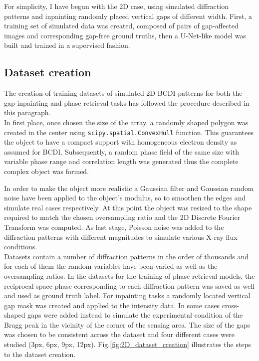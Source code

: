 For simplicity, I have begun with the 2D case, using simulated diffraction patterns and inpainting randomly placed 
vertical gaps of different width. First, a training set of simulated data was created, composed of pairs of gap-affected 
images and corresponding gap-free ground truths, then a U-Net-like model was built and trained in a supervised fashion.

\subsection{Dataset creation}\label{sec:dataset_creation2D}

The creation of training datasets of simulated 2D BCDI patterns for both the gap-inpainting and phase retrieval tasks has followed the procedure
described in this paragraph.\\
In first place, once chosen the size of the array, a randomly shaped polygon was created in the center using 
\texttt{scipy.spatial.ConvexHull} function. This guarantees the object to have a compact support with homogeneous electron 
density as assumed for BCDI. Subsequently, a random phase field of the same size with variable phase range and correlation 
length was generated thus the complete complex object was formed.

In order to make the object more realistic a Gaussian filter and Gaussian random noise have been applied to the 
object's modulus, so to smoothen the edges and simulate real cases respectively. At this point the object was resized 
to the shape required to match the chosen oversampling ratio and the 2D Discrete Fourier Transform was computed. As 
last stage, Poisson noise was added to the diffraction patterns with different magnitudes to simulate 
various X-ray flux conditions. \\
Datasets contain a number of diffraction patterns in the order of thousands and for each of them the random variables 
have been varied as well as the oversampling ratios. In the datasets for the training of phase retrieval models, 
the reciprocal space phase corresponding to each diffraction pattern was saved as well and used as ground truth label. 
For inpainting tasks a randomly located vertical gap mask was created and applied to the intensity data. In some cases 
cross-shaped gaps were added instead to simulate the experimental condition of the Bragg peak in the vicinity of the 
corner of the sensing area. The size of the gaps was chosen to be consistent across the dataset and four different 
cases were studied (3px, 6px, 9px, 12px). Fig.\ref{fig:2D_dataset_creation} illustrates the steps to the dataset creation. 

